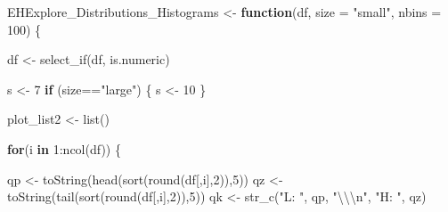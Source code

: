 \documentclass[
]{article}
\newenvironment{Shaded}{\begin{snugshade}}{\end{snugshade}}
\newcommand{\AttributeTok}[1]{\textcolor[rgb]{0.77,0.63,0.00}{#1}}
\newcommand{\ControlFlowTok}[1]{\textcolor[rgb]{0.13,0.29,0.53}{\textbf{#1}}}
\newcommand{\DecValTok}[1]{\textcolor[rgb]{0.00,0.00,0.81}{#1}}
\newcommand{\FunctionTok}[1]{\textcolor[rgb]{0.00,0.00,0.00}{#1}}
\newcommand{\NormalTok}[1]{#1}
\newcommand{\OtherTok}[1]{\textcolor[rgb]{0.56,0.35,0.01}{#1}}
\newcommand{\SpecialCharTok}[1]{\textcolor[rgb]{0.00,0.00,0.00}{#1}}
\newcommand{\StringTok}[1]{\textcolor[rgb]{0.31,0.60,0.02}{#1}}
\begin{document}
\begin{Shaded}
\begin{Highlighting}[]
\NormalTok{EHExplore\_Distributions\_Histograms }\OtherTok{\textless{}{-}} \ControlFlowTok{function}\NormalTok{(df, }\AttributeTok{size =} \StringTok{"small"}\NormalTok{, }\AttributeTok{nbins =} \DecValTok{100}\NormalTok{)}
\NormalTok{\{}
  
\NormalTok{df }\OtherTok{\textless{}{-}} \FunctionTok{select\_if}\NormalTok{(df, is.numeric)}
    
\NormalTok{s }\OtherTok{\textless{}{-}} \DecValTok{7}
\ControlFlowTok{if}\NormalTok{ (size}\SpecialCharTok{==}\StringTok{"large"}\NormalTok{) \{}
\NormalTok{  s }\OtherTok{\textless{}{-}} \DecValTok{10}
\NormalTok{\}}

\NormalTok{plot\_list2 }\OtherTok{\textless{}{-}} \FunctionTok{list}\NormalTok{()}

\ControlFlowTok{for}\NormalTok{(i }\ControlFlowTok{in} \DecValTok{1}\SpecialCharTok{:}\FunctionTok{ncol}\NormalTok{(df)) \{     }
  
\NormalTok{  qp }\OtherTok{\textless{}{-}} \FunctionTok{toString}\NormalTok{(}\FunctionTok{head}\NormalTok{(}\FunctionTok{sort}\NormalTok{(}\FunctionTok{round}\NormalTok{(df[,i],}\DecValTok{2}\NormalTok{)),}\DecValTok{5}\NormalTok{))}
\NormalTok{  qz }\OtherTok{\textless{}{-}} \FunctionTok{toString}\NormalTok{(}\FunctionTok{tail}\NormalTok{(}\FunctionTok{sort}\NormalTok{(}\FunctionTok{round}\NormalTok{(df[,i],}\DecValTok{2}\NormalTok{)),}\DecValTok{5}\NormalTok{))}
\NormalTok{  qk }\OtherTok{\textless{}{-}} \FunctionTok{str\_c}\NormalTok{(}\StringTok{"L:   "}\NormalTok{, qp, }\StringTok{"}\SpecialCharTok{\textbackslash{}\textbackslash{}\textbackslash{}n}\StringTok{"}\NormalTok{, }\StringTok{"H:   "}\NormalTok{, qz)}
  

\end{Highlighting}
\end{Shaded}
\end{document}
